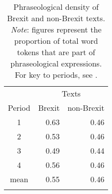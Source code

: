 \documentclass[output=paper]{langscibook}
\begin{document}
\begin{table}
\begin{tabular}{crr}
\lsptoprule
       & \multicolumn{2}{c}{Texts}\\\cmidrule(lr){2-3}
Period & Brexit & non-Brexit\\\midrule
1    & 0.63 & 0.46\\
2    & 0.53 & 0.46\\
3    & 0.49 & 0.44\\
4    & 0.56 & 0.46\\
mean & 0.55 & 0.46\\
\lspbottomrule
\end{tabular}
\caption{Phraseological density of Brexit and non-Brexit texts. \textit{Note}: figures represent the proportion of total word tokens that are part of phraseological expressions. For key to periods, see .\label{tab:buerki:2}}
\end{table}
\end{document}
